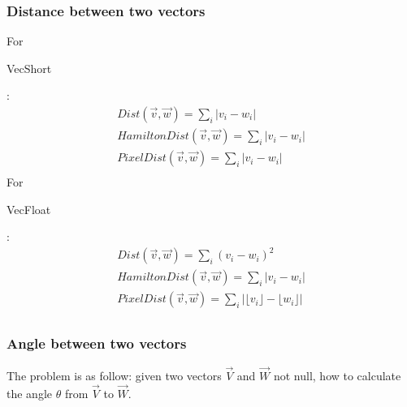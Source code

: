 \subsubsection{Distance between two vectors}

For \begin{ttfamily}VecShort\end{ttfamily}:\\

\begin{equation}
\begin{array}{l}
Dist(\overrightarrow{v},\overrightarrow{w})=\sum_i|v_i-w_i|\\
HamiltonDist(\overrightarrow{v},\overrightarrow{w})=\sum_i|v_i-w_i|\\
PixelDist(\overrightarrow{v},\overrightarrow{w})=\sum_i|v_i-w_i|\\
\end{array}
\end{equation}
For \begin{ttfamily}VecFloat\end{ttfamily}:\\
\begin{equation}
\begin{array}{l}
Dist(\overrightarrow{v},\overrightarrow{w})=\sum_i(v_i-w_i)^2\\
HamiltonDist(\overrightarrow{v},\overrightarrow{w})=\sum_i|v_i-w_i|\\
PixelDist(\overrightarrow{v},\overrightarrow{w})=\sum_i\left|\lfloor v_i\rfloor -\lfloor w_i\rfloor\right|\\
\end{array}
\end{equation}

\subsubsection{Angle between two vectors}

The problem is as follow: given two vectors $\vec{V}$ and $\vec{W}$ not null, how to calculate the angle $\theta$ from $\vec{V}$ to $\vec{W}$.\\

